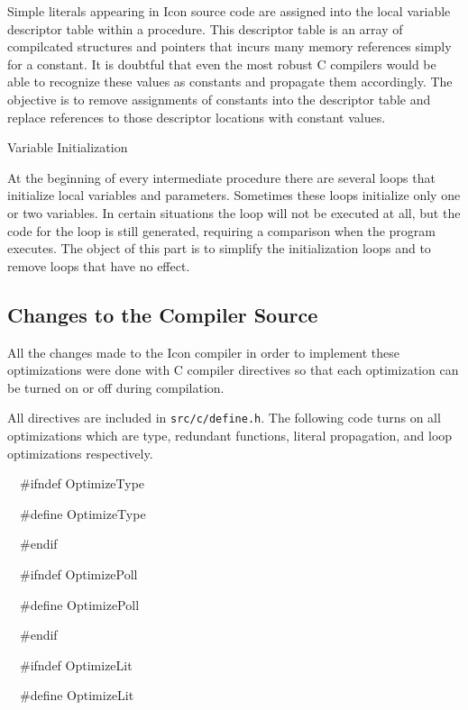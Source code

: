 Simple literals appearing in Icon source code are assigned into the
local variable descriptor table within a procedure. This descriptor
table is an array of compilcated structures and pointers that incurs
many memory references simply for a constant. It is doubtful that
even the most robust C compilers would be able to recognize these
values as constants and propagate them accordingly. The objective is
to remove assignments of constants into the descriptor table and
replace references to those descriptor locations with constant values.

{\sffamily
Variable Initialization}

At the beginning of every intermediate procedure there are several
loops that initialize local variables and parameters.  Sometimes these
loops initialize only one or two variables. In certain situations the
loop will not be executed at all, but the code for the loop is still
generated, requiring a comparison when the program executes. The
object of this part is to simplify the initialization loops and to
remove loops that have no effect.

\subsection{Changes to the Compiler Source}

All the changes made to the Icon compiler in order to implement these
optimizations were done with C compiler directives so that each
optimization can be turned on or off during compilation.

All directives are included in \texttt{src/c/define.h}. The following
code turns on all optimizations which are type, redundant functions,
literal propagation, and loop optimizations respectively.

{\ttfamily\mdseries
\ \ \#ifndef OptimizeType}

{\ttfamily\mdseries
\ \ \#define OptimizeType}

{\ttfamily\mdseries
\ \ \#endif}


\bigskip

{\ttfamily\mdseries
\ \ \#ifndef OptimizePoll}

{\ttfamily\mdseries
\ \ \#define OptimizePoll}

{\ttfamily\mdseries
\ \ \#endif}


\bigskip

{\ttfamily\mdseries
\ \ \#ifndef OptimizeLit}

{\ttfamily\mdseries
\ \ \#define OptimizeLit}

